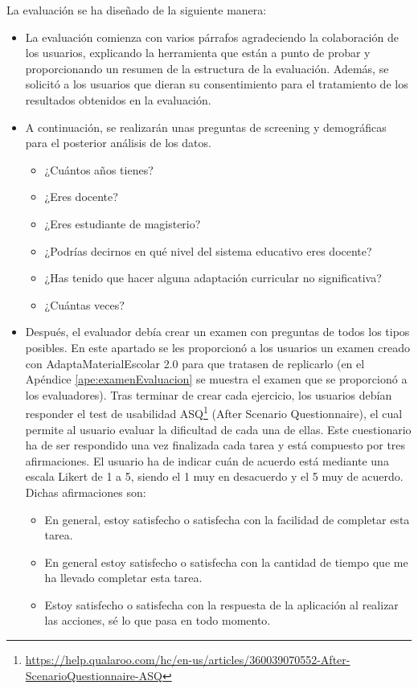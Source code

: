 La evaluación se ha diseñado de la siguiente manera:
\begin{itemize}
    \item La evaluación comienza con varios párrafos agradeciendo la colaboración de los usuarios, explicando la herramienta que están a punto de probar y proporcionando un resumen de la estructura de la evaluación. Además, se solicitó a los usuarios que dieran su consentimiento para el tratamiento de los resultados obtenidos en la evaluación.
    \item A continuación, se realizarán unas preguntas de screening y demográficas para el posterior análisis de los datos.
          \begin{itemize}
              \item ¿Cuántos años tienes?
              \item ¿Eres docente?
              \item ¿Eres estudiante de magisterio?
              \item ¿Podrías decirnos en qué nivel del sistema educativo eres docente?
              \item ¿Has tenido que hacer alguna adaptación curricular no significativa?
              \item ¿Cuántas veces?
          \end{itemize}
    \item Después, el evaluador debía crear un examen con preguntas de todos los tipos posibles. En este apartado se les proporcionó a los usuarios un examen creado con AdaptaMaterialEscolar 2.0 para que tratasen de replicarlo (en el Apéndice \ref{ape:examenEvaluacion} se muestra el examen que se proporcionó a los evaluadores). Tras terminar de crear cada ejercicio, los usuarios debían responder el test de usabilidad ASQ\footnote{\url{https://help.qualaroo.com/hc/en-us/articles/360039070552-After-ScenarioQuestionnaire-ASQ}} (After Scenario Questionnaire), el cual permite al usuario evaluar la dificultad de cada una de ellas. Este cuestionario ha de ser respondido una vez finalizada cada tarea y está compuesto por tres afirmaciones. El usuario ha de indicar cuán de acuerdo está mediante una escala Likert de 1 a 5, siendo el 1 muy en desacuerdo y el 5 muy de acuerdo. Dichas afirmaciones son:
          \begin{itemize}
              \item En general, estoy  satisfecho o satisfecha con la facilidad de completar esta tarea.
              \item En general estoy  satisfecho o satisfecha con la cantidad de tiempo que me ha llevado completar esta tarea.
              \item Estoy  satisfecho o satisfecha con la respuesta de la aplicación al realizar las acciones, sé lo que pasa en todo momento.
          \end{itemize}


\end{itemize}
